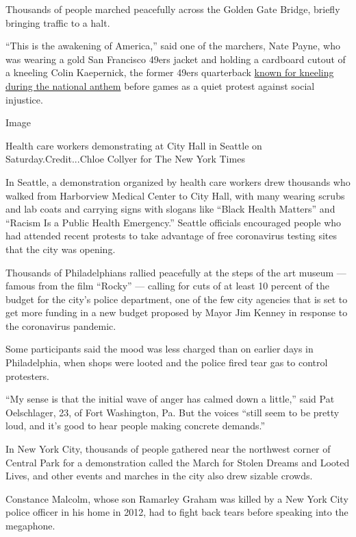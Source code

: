 Thousands of people marched peacefully across the Golden Gate Bridge,
briefly bringing traffic to a halt.

``This is the awakening of America,'' said one of the marchers, Nate
Payne, who was wearing a gold San Francisco 49ers jacket and holding a
cardboard cutout of a kneeling Colin Kaepernick, the former 49ers
quarterback
\href{https://www.nytimes3xbfgragh.onion/2020/06/05/sports/football/george-floyd-kaepernick-kneeling-nfl-protests.html}{known
for kneeling during the national anthem} before games as a quiet protest
against social injustice.

Image

Health care workers demonstrating at City Hall in Seattle on
Saturday.Credit...Chloe Collyer for The New York Times

In Seattle, a demonstration organized by health care workers drew
thousands who walked from Harborview Medical Center to City Hall, with
many wearing scrubs and lab coats and carrying signs with slogans like
``Black Health Matters'' and ``Racism Is a Public Health Emergency.''
Seattle officials encouraged people who had attended recent protests to
take advantage of free coronavirus testing sites that the city was
opening.

Thousands of Philadelphians rallied peacefully at the steps of the art
museum --- famous from the film ``Rocky'' --- calling for cuts of at
least 10 percent of the budget for the city's police department, one of
the few city agencies that is set to get more funding in a new budget
proposed by Mayor Jim Kenney in response to the coronavirus pandemic.

Some participants said the mood was less charged than on earlier days in
Philadelphia, when shops were looted and the police fired tear gas to
control protesters.

``My sense is that the initial wave of anger has calmed down a little,''
said Pat Oelschlager, 23, of Fort Washington, Pa. But the voices ``still
seem to be pretty loud, and it's good to hear people making concrete
demands.''

In New York City, thousands of people gathered near the northwest corner
of Central Park for a demonstration called the March for Stolen Dreams
and Looted Lives, and other events and marches in the city also drew
sizable crowds.

Constance Malcolm, whose son Ramarley Graham was killed by a New York
City police officer in his home in 2012, had to fight back tears before
speaking into the megaphone.

